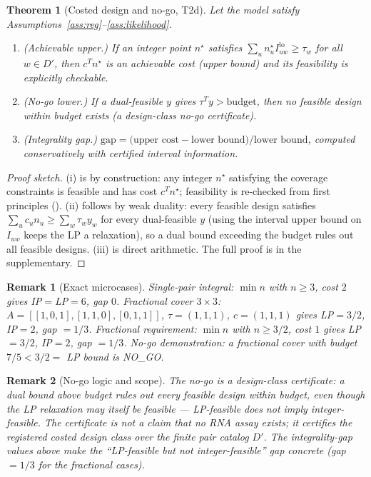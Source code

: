 \documentclass[11pt]{article}
\newtheorem{theorem}{Theorem}
\newtheorem{remark}{Remark}
\begin{document}
\begin{theorem}[Costed design and no-go, T2d]\label{thm:t2d}
Let the model satisfy Assumptions~\ref{ass:reg}--\ref{ass:likelihood}.
\begin{enumerate}[nosep]
  \item \emph{(Achievable upper.)} If an integer point $n^\star$ satisfies
        $\sum_u n^\star_u I_{uw}^{\mathrm{lo}}\ge \tau_w$ for all $w\in D'$, then $c^T n^\star$ is an
        achievable cost (upper bound) and its feasibility is explicitly checkable.
  \item \emph{(No-go lower.)} If a dual-feasible $y$ gives $\tau^T y>\mathrm{budget}$, then no feasible
        design within budget exists (a \emph{design-class no-go certificate}).
  \item \emph{(Integrality gap.)}
        $\mathrm{gap}=\bigl(\text{upper cost}-\text{lower bound}\bigr)/\text{lower bound}$, computed
        conservatively with certified interval information.
\end{enumerate}
\end{theorem}

\begin{proof}[Proof sketch]
(i) is by construction: any integer $n^\star$ satisfying the coverage constraints is feasible and has
cost $c^Tn^\star$; feasibility is re-checked from first principles
(). (ii) follows by weak duality: every feasible
design satisfies $\sum_u c_u n_u\ge\sum_w\tau_w y_w$ for every dual-feasible $y$ (using the interval
upper bound on $I_{uw}$ keeps the LP a relaxation), so a dual bound exceeding the budget rules out all
feasible designs. (iii) is direct arithmetic. The full proof is in the supplementary.
\end{proof}

\begin{remark}[Exact microcases]\label{rem:costed}
\emph{Single-pair integral:} $\min n$ with $n\ge 3$, cost $2$ gives IP$=$LP$=6$, gap $0$.
\emph{Fractional cover $3\times3$:} $A=[[1,0,1],[1,1,0],[0,1,1]]$, $\tau=(1,1,1)$, $c=(1,1,1)$ gives
LP$=3/2$, IP$=2$, gap $=1/3$. \emph{Fractional requirement:} $\min n$ with $n\ge 3/2$, cost $1$ gives
LP$=3/2$, IP$=2$, gap $=1/3$. \emph{No-go demonstration:} a fractional cover with budget $7/5<3/2=$ LP
bound is NO\_GO.
\end{remark}

\begin{remark}[No-go logic and scope]\label{rem:nogo}
The no-go is a \emph{design-class} certificate: a dual bound above budget rules out \emph{every}
feasible design within budget, even though the LP relaxation may itself be feasible ---
LP-feasible does not imply integer-feasible. The certificate is not a claim that no RNA assay exists;
it certifies the registered costed design class over the finite pair catalog $D'$. The integrality-gap
values above make the ``LP-feasible but not integer-feasible'' gap concrete (gap $=1/3$ for the
fractional cases).
\end{remark}
\end{document}
